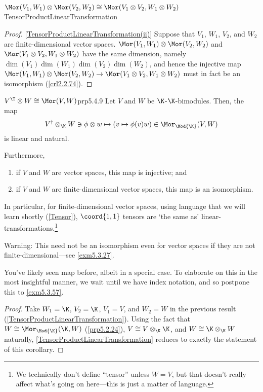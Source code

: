 \begin{thm}{$\Mor (V_1,W_1)\otimes \Mor (V_2,W_2)\cong \Mor (V_1\otimes V_2,W_1\otimes W_2)$}{TensorProductLinearTransformation}
\begin{proof}
		\blni
		\cref{TensorProductLinearTransformation(ii)} Suppose that $V_1$, $W_1$, $V_2$, and $W_2$ are finite-dimensional vector spaces.  $\Mor (V_1,W_1)\otimes \Mor (V_2,W_2)$ and $\Mor (V_1\otimes V_2,W_1\otimes W_2)$ have the same dimension, namely $\dim (V_1)\dim (W_1)\dim (V_2)\dim (W_2)$, and hence the injective map $\Mor (V_1,W_1)\otimes \Mor (V_2,W_2)\rightarrow \Mor (V_1\otimes V_2,W_1\otimes W_2)$ must in fact be an isomorphism (\cref{crl2.2.74}).
	\end{proof}
\end{thm}
\begin{crl}{$V^{\T}\otimes W\cong \Mor (V,W)$}{prp5.4.9}
	Let $V$ and $W$ be $\K$-$\K$-bimodules.  Then, the map
	\begin{equation}
		V^{\dagger}\otimes _{\K}W\ni \phi \otimes w\mapsto (v\mapsto \phi (v)w)\in \Mor _{\Mod{\K}}(V,W)
	\end{equation}
	is linear and natural.
	
	Furthermore,
	\begin{enumerate}
		\item if $V$ and $W$ are vector spaces, this map is injective; and
		\item if $V$ and $W$ are finite-dimensional vector spaces, this map is an isomorphism.
	\end{enumerate}
	\begin{rmk}
		In particular, for finite-dimensional vector spaces, using language that we will learn shortly (\cref{Tensor}), $\coord{1,1}$ tensors are `the same as' linear-transformations.\footnote{We technically don't define ``tensor'' unless $W=V$, but that doesn't really affect what's going on here---this is just a matter of language.}
	\end{rmk}
	\begin{rmk}
		Warning:  This need not be an isomorphism even for vector spaces if they are not finite-dimensional---see \cref{exm5.3.27}.
	\end{rmk}
	\begin{rmk}
		You've likely seen map before, albeit in a special case.  To elaborate on this in the most insightful manner, we wait until we have index notation, and so postpone this to \cref{exm5.3.57}.
	\end{rmk}
	\begin{proof}
		Take $W_1=\K$, $V_2=\K$, $V_1=V$, and $W_2=W$ in the previous result (\cref{TensorProductLinearTransformation}).  Using the fact that $W\cong \Mor _{\Mod{\K}}(\K ,W)$ (\cref{prp5.2.24}), $V\cong V\otimes _{\K}\K$, and $W\cong \K \otimes _{\K}W$ naturally, \cref{TensorProductLinearTransformation} reduces to exactly the statement of this corollary.
	\end{proof}
\end{crl}

